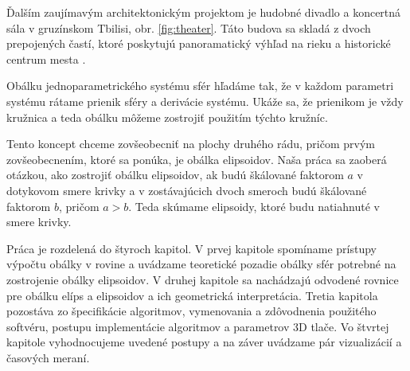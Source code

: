 Ďalším zaujímavým architektonickým projektom je hudobné divadlo a koncertná sála v gruzínskom Tbilisi, obr. \ref{fig:theater}. Táto budova sa skladá z dvoch prepojených častí, ktoré poskytujú panoramatický výhľad na rieku a historické centrum mesta \cite{Mesz18}.

Obálku jednoparametrického systému sfér hľadáme tak, že v každom parametri systému rátame prienik sféry a derivácie systému. Ukáže sa, že prienikom je vždy kružnica a teda obálku môžeme zostrojiť použitím týchto kružníc. 

Tento koncept chceme zovšeobecniť na plochy druhého rádu, pričom prvým zovšeobecnením, ktoré sa ponúka, je obálka elipsoidov. Naša práca sa zaoberá otázkou, ako zostrojiť obálku elipsoidov, ak budú škálované faktorom $a$ v dotykovom smere krivky a v zostávajúcich dvoch smeroch budú škálované faktorom $b$, pričom $a > b.$ Teda skúmame elipsoidy, ktoré budu natiahnuté v smere krivky.

Práca je rozdelená do štyroch kapitol. V prvej kapitole spomíname prístupy výpočtu obálky v rovine a uvádzame teoretické pozadie obálky sfér potrebné na zostrojenie obálky elipsoidov. V druhej kapitole sa nachádzajú odvodené rovnice pre obálku elíps a elipsoidov a ich geometrická interpretácia. Tretia kapitola pozostáva zo špecifikácie algoritmov, vymenovania a zdôvodnenia použitého softvéru, postupu implementácie algoritmov a parametrov 3D tlače. Vo štvrtej kapitole vyhodnocujeme uvedené postupy a na záver uvádzame pár vizualizácií a časových meraní.